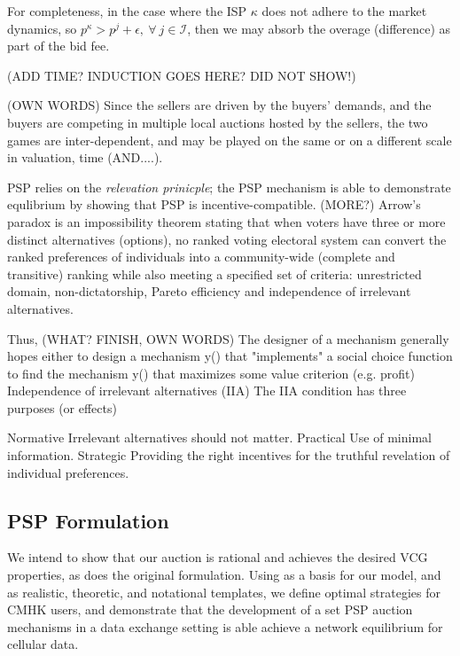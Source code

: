 \documentclass[12pt]{article}
\theoremstyle{definition}
\newcommand{\mcI}{\mathcal{I}}
\begin{document}
\begin{multicols}{2}
For completeness, in the case where the ISP $\kappa$ 
does not adhere to the market dynamics, so $p^\kappa > p^j +
\epsilon, \ \forall \ j \in\mcI$, then we may absorb the overage (difference) as part of the
bid fee.

(ADD TIME? INDUCTION GOES HERE? DID NOT SHOW!)

(OWN
WORDS) Since the sellers are driven by the buyers' demands, and the buyers are
competing in multiple local auctions hosted by the sellers, the two games are
inter-dependent, and may be played on the same or on a different scale in
valuation, time (AND....). 


PSP relies on the \emph{relevation prinicple}; the
PSP mechanism is able to demonstrate equlibrium by showing that PSP is
incentive-compatible. (MORE?)
Arrow's paradox is an impossibility theorem stating that when voters have three
or more distinct alternatives (options), no ranked voting electoral system can
convert the ranked preferences of individuals into a community-wide (complete
and transitive) ranking while also meeting a specified set of criteria:
unrestricted domain, non-dictatorship, Pareto efficiency and independence of
irrelevant alternatives.

Thus, (WHAT? FINISH, OWN WORDS)
The designer of a mechanism generally hopes either to design a mechanism
y() that "implements" a social choice function to find the
mechanism y() that maximizes some value criterion (e.g. profit)
Independence of irrelevant alternatives (IIA)
The IIA condition has three purposes (or effects)

Normative
Irrelevant alternatives should not matter.
Practical
Use of minimal information.
Strategic
Providing the right incentives for the truthful revelation of individual
preferences. 

\subsection{PSP Formulation}

We intend to show that our auction
is rational and achieves the desired VCG properties, as does the original
formulation. Using \cite{zheng} as a basis for our model, and \cite{lazar} as
realistic, theoretic, and notational templates, we define optimal strategies for
CMHK users, and demonstrate that the development of a set PSP auction mechanisms
in a data exchange setting is able achieve a network equilibrium for cellular data. 



\end{multicols}
\end{document}
